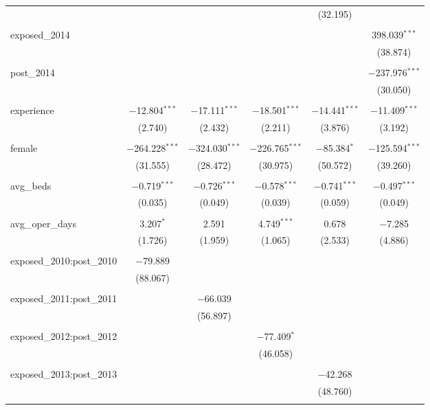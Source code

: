\begin{table}[!htbp]
\begin{adjustbox}{width=\textwidth}
\begin{tabular}{@{\extracolsep{5pt}}lccccc}
  &  &  &  & (32.195) &  \\ 
  & & & & & \\ 
 exposed\_2014 &  &  &  &  & 398.039$^{***}$ \\ 
  &  &  &  &  & (38.874) \\ 
  & & & & & \\ 
 post\_2014 &  &  &  &  & $-$237.976$^{***}$ \\ 
  &  &  &  &  & (30.050) \\ 
  & & & & & \\ 
 experience & $-$12.804$^{***}$ & $-$17.111$^{***}$ & $-$18.501$^{***}$ & $-$14.441$^{***}$ & $-$11.409$^{***}$ \\ 
  & (2.740) & (2.432) & (2.211) & (3.876) & (3.192) \\ 
  & & & & & \\ 
 female & $-$264.228$^{***}$ & $-$324.030$^{***}$ & $-$226.765$^{***}$ & $-$85.384$^{*}$ & $-$125.594$^{***}$ \\ 
  & (31.555) & (28.472) & (30.975) & (50.572) & (39.260) \\ 
  & & & & & \\ 
 avg\_beds & $-$0.719$^{***}$ & $-$0.726$^{***}$ & $-$0.578$^{***}$ & $-$0.741$^{***}$ & $-$0.497$^{***}$ \\ 
  & (0.035) & (0.049) & (0.039) & (0.059) & (0.049) \\ 
  & & & & & \\ 
 avg\_oper\_days & 3.207$^{*}$ & 2.591 & 4.749$^{***}$ & 0.678 & $-$7.285 \\ 
  & (1.726) & (1.959) & (1.065) & (2.533) & (4.886) \\ 
  & & & & & \\ 
 exposed\_2010:post\_2010 & $-$79.889 &  &  &  &  \\ 
  & (88.067) &  &  &  &  \\ 
  & & & & & \\ 
 exposed\_2011:post\_2011 &  & $-$66.039 &  &  &  \\ 
  &  & (56.897) &  &  &  \\ 
  & & & & & \\ 
 exposed\_2012:post\_2012 &  &  & $-$77.409$^{*}$ &  &  \\ 
  &  &  & (46.058) &  &  \\ 
  & & & & & \\ 
 exposed\_2013:post\_2013 &  &  &  & $-$42.268 &  \\ 
  &  &  &  & (48.760) &  \\ 
  & & & & & \\ 

\end{tabular}
\end{adjustbox}
\end{table}
